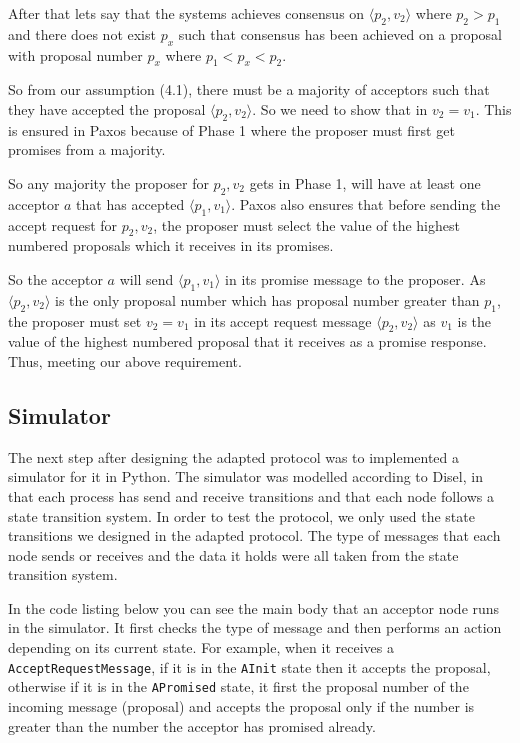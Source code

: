 After that lets say that the systems achieves consensus on
$\langle p_2, v_2 \rangle$ where $p_2 > p_1$ and there does not exist $p_x$ such
that consensus has been achieved on a proposal with proposal
number $p_x$ where $p_1 < p_x < p_2$.

So from our assumption (4.1), there must be a majority of acceptors
such that they have accepted the proposal $\langle p_2, v_2 \rangle$.
So we need to show that in $v_2 = v_1$.
This is ensured in Paxos because of Phase 1 where the proposer must first
get promises from a majority.

So any majority the proposer for $p_2, v_2$ gets in Phase 1,
will have at least one acceptor $a$ that has accepted $\langle p_1, v_1 \rangle$.
Paxos also ensures that before sending the accept request for
$p_2, v_2$, the proposer must select the value of the highest numbered
proposals which it receives in its promises.

So the acceptor $a$ will send $\langle p_1, v_1 \rangle$ in its promise message to
the proposer. As $\langle p_2, v_2 \rangle$ is the only proposal number which has
proposal number greater than $p_1$, the proposer must set $v_2 = v_1$ in its
accept request message $\langle p_2, v_2 \rangle$ as $v_1$ is the value of the
highest numbered proposal that it receives as a promise response.
Thus, meeting our above requirement.

\subsection{Simulator}
The next step after designing the adapted protocol was to
implemented a simulator for it in Python. The simulator was modelled according
to Disel, in that each process has send and receive transitions and that each
node follows a state transition system. In order to test the protocol, we only
used the state transitions we designed in the adapted protocol. The type
of messages that each node sends or receives and the data it holds
were all taken from the state transition system.

In the code listing below you can see the main body that an acceptor node
runs in the simulator. It first checks the type of message and then performs
an action depending on its current state. For example, when it receives a
\texttt{AcceptRequestMessage}, if it is in the \texttt{AInit} state then it
accepts the proposal, otherwise if it is in the \texttt{APromised} state, it
first the proposal number of the incoming message (proposal)
and accepts the proposal only if the number is greater than the number
the acceptor has promised already.

